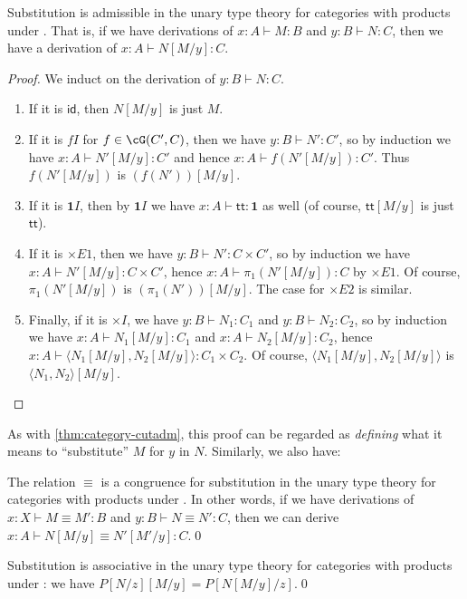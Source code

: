 \documentclass{book}
\def\idfunc{\mathsf{id}}
\let\types\vdash
\def\unit{\mathbf{1}}
\def\ttt{\mathsf{tt}}
\def\timesE{\ensuremath{\mathord{\times}E}}
\def\timesI{\ensuremath{\mathord{\times}I}}
\def\pair#1#2{\langle #1,#2\rangle}
\begin{document}
\begin{thm}\label{thm:catprod-subadm}
  Substitution is admissible in the unary type theory for categories with products under \cG.
  That is, if we have derivations of $x:A\types M:B$ and $y:B \types N:C$, then we have a derivation of $x:A \types N[M/y]:C$.
\end{thm}
\begin{proof}
  We induct on the derivation of $y:B \types N:C$.
  \begin{enumerate}
  \item If it is $\idfunc$, then $N[M/y]$ is just $M$.  
  \item If it is $fI$ for $f\in \cG(C',C)$, then we have $y:B \types N':C'$, so by induction we have $x:A\types N'[M/y]:C'$ and hence $x:A\types f(N'[M/y]):C'$.
    Thus $f(N'[M/y])$ is $(f(N'))[M/y]$.
  \item If it is $\unit I$, then by $\unit I$ we have $x:A \types \ttt:\unit$ as well (of course, $\ttt[M/y]$ is just $\ttt$).
  \item If it is $\timesE1$, then we have $y:B\types N':C\times C'$, so by induction we have $x:A \types N'[M/y]:C\times C'$, hence $x:A \types \pi_1(N'[M/y]):C$ by $\timesE1$.
    Of course, $\pi_1(N'[M/y])$ is $(\pi_1(N'))[M/y]$.
    The case for $\timesE2$ is similar.
  \item Finally, if it is $\timesI$, we have $y:B\types N_1:C_1$ and $y:B\types N_2:C_2$, so by induction we have $x:A \types N_1[M/y]:C_1$ and $x:A \types N_2[M/y]:C_2$, hence $x:A \types \pair{N_1[M/y]}{N_2[M/y]}:C_1\times C_2$.
    Of course, $\pair{N_1[M/y]}{N_2[M/y]}$ is $\pair{N_1}{N_2}[M/y]$.\qedhere
  \end{enumerate}
\end{proof}

As with \cref{thm:category-cutadm}, this proof can be regarded as \emph{defining} what it means to ``substitute'' $M$ for $y$ in $N$.
Similarly, we also have:

\begin{thm}\label{thm:catprod-subcong}
  The relation $\equiv$ is a congruence for substitution in the unary type theory for categories with products under \cG.
  In other words, if we have derivations of $x:X \types M\equiv M':B$ and $y:B \types N\equiv N':C$, then we can derive $x:A \types N[M/y] \equiv N'[M'/y]:C$.\qed
\end{thm}

\begin{thm}\label{thm:catprod-subassoc}
  Substitution is associative in the unary type theory for categories with products under \cG: we have $P[N/z][M/y] = P[N[M/y]/z]$.\qed
\end{thm}
\end{document}
